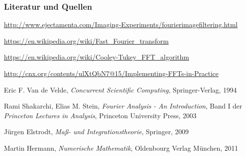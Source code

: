 \documentclass[aspectratio=169]{beamer}
\newcommand{\listingcall}{Listing}
\newlength{\listingmargin}
\newcommand{\inputlistingn}[3][]{
	\begin{center}
		\begin{adjustwidth}{\listingmargin}{\listingmargin}
			\centerline{ {\fontfamily{lmr}\selectfont\scshape \listingcall:}\quad #2 }
			
		\end{adjustwidth}
	\end{center}
}
\newcounter{listingc}[section]
\newcommand*\listingnum{\thesection.\arabic{listingc}}
\newcommand{\inputlisting}[3][]{
	\refstepcounter{listingc}
	\addcontentsline{listinglist}{figure}{\protect{\numberline{\listingnum:} #2 } }
	\inputlistingn[#1]{#2}{#3}
}
\begin{document}
		\begin{frame}
			\frametitle{Literatur und Quellen}
			\begin{enumerate}[label = {[\arabic*]}]
				\item \url{http://www.ejectamenta.com/Imaging-Experiments/fourierimagefiltering.html}
				\item \url{https://en.wikipedia.org/wiki/Fast_Fourier_transform}
				\item \url{https://en.wikipedia.org/wiki/Cooley-Tukey_FFT_algorithm}
				\item \url{http://cnx.org/contents/ulXtQbN7@15/Implementing-FFTs-in-Practice}
				\item Eric F. Van de Velde, \textit{Concurrent Scientific Computing}, Springer-Verlag, 1994
				\item Rami Shakarchi, Elias M. Stein, \textit{Fourier Analysis - An Introduction}, Band I der \textit{Princeton Lectures in Analysis}, Princeton University Press, 2003
				\item Jürgen Elstrodt, \textit{Maß- und Integrationstheorie}, Springer, 2009
				\item Martin Hermann, \textit{Numerische Mathematik}, Oldenbourg Verlag München, 2011
			\end{enumerate}
		\end{frame}

	


\end{document}
